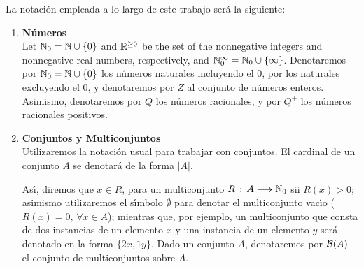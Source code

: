 La notaci\'{o}n empleada a lo largo de este trabajo ser\'{a} la siguiente:
\begin{enumerate}
\item {\bf N\'{u}meros}\\
Let $\mathbb{N}_{0} = \mathbb{N} \cup \{0\}$ and $\mathbb{R}^{\geq 0}$ be the set of the 
nonnegative integers and nonnegative real numbers, respectively,
and $\mathbb{N}_{0}^{\infty} = \mathbb{N}_{0} \cup \left\{\infty \right\}$. 
Denotaremos por $\mathbb{N}_{0} = \mathbb{N} \cup \{0\}$ los n\'{u}meros naturales
incluyendo el 0, por los naturales excluyendo el 0, y
denotaremos por $Z$ al conjunto de n\'{u}meros enteros.
Asimismo, denotaremos por $Q$ los n\'{u}meros racionales, y por
$Q^{+}$ los n\'{u}meros racionales positivos.
\item {\bf Conjuntos y Multiconjuntos}\\
Utilizaremos la notaci\'{o}n usual para trabajar con
conjuntos. El cardinal de un conjunto $A$
se denotar\'{a} de la forma $|A|$.

As\'{\i}, diremos
que $x \in R$, para un multiconjunto $R\,:\,A \longrightarrow \mathbb{N}_{0}$
sii $R(x) > 0$; asimismo utilizaremos el s\'{\i}mbolo
$\emptyset$ para denotar el
multiconjunto vac\'{\i}o ($R(x)=0,\,\forall x \in A$); mientras que,
por ejemplo,
un multiconjunto que consta de dos
instancias de un elemento $x$ y una instancia de un elemento $y$
ser\'{a} denotado en la forma $\{2x,1y\}$. Dado un conjunto
$A$, denotaremos por ${\cal B}(A)$ el conjunto de multiconjuntos
sobre $A$.


\end{enumerate}
